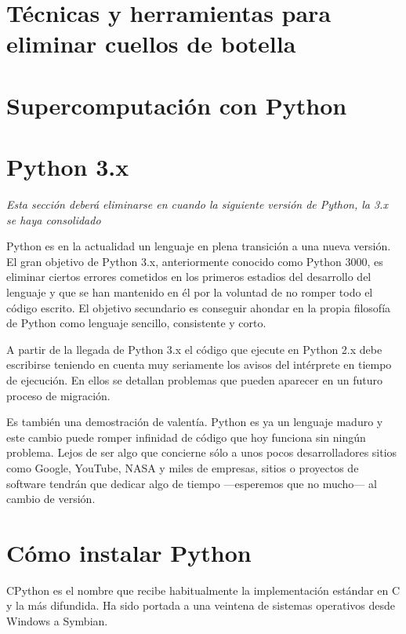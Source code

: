 \documentclass[a4paper,10pt]{article}
\begin{document}
\section{Técnicas y herramientas para eliminar cuellos de botella}

\section{Supercomputación con Python}

\appendix

\section{Python 3.x}

\emph{Esta sección deberá eliminarse en cuando la siguiente versión de
Python, la 3.x se haya consolidado}

Python es en la actualidad un lenguaje en plena transición a una nueva
versión.  El gran objetivo de Python 3.x, anteriormente conocido como
Python 3000, es eliminar ciertos errores cometidos en los primeros
estadios del desarrollo del lenguaje y que se han mantenido en él por
la voluntad de no romper todo el código escrito. El objetivo
secundario es conseguir ahondar en la propia filosofía de Python como
lenguaje sencillo, consistente y corto.

A partir de la llegada de Python 3.x el código que ejecute en Python
2.x debe escribirse teniendo en cuenta muy seriamente los avisos del
intérprete en tiempo de ejecución.  En ellos se detallan problemas que
pueden aparecer en un futuro proceso de migración.

Es también una demostración de valentía.  Python es ya un lenguaje
maduro y este cambio puede romper infinidad de código que hoy funciona
sin ningún problema.  Lejos de ser algo que concierne sólo a unos
pocos desarrolladores sitios como Google, YouTube, NASA y miles de
empresas, sitios o proyectos de software tendrán que dedicar algo de
tiempo ---esperemos que no mucho--- al cambio de versión.

\section{Cómo instalar Python}
\label{sec:instalar}

CPython es el nombre que recibe habitualmente la implementación
estándar en C y la más difundida. Ha sido portada a una veintena de
sistemas operativos desde Windows a Symbian.
\end{document}

